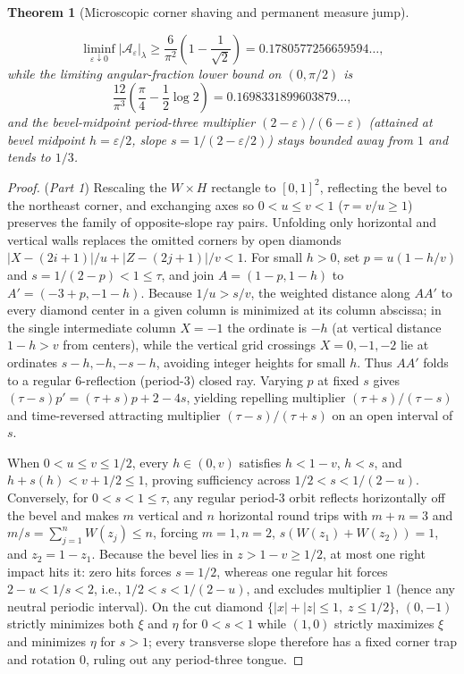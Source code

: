 \documentclass[11pt,reqno]{amsart}
\newtheorem{theorem}{Theorem}[section]
\theoremstyle{definition}
\theoremstyle{remark}
\begin{document}
\begin{theorem}[Microscopic corner shaving and permanent measure jump]
\begin{enumerate}
  \begin{equation}\label{eq:shaving-jump}
    \liminf_{\varepsilon \downarrow 0} |\mathcal{A}_\varepsilon|_\lambda \ge \frac{6}{\pi^2}\left(1 - \frac{1}{\sqrt{2}}\right) = 0.1780577256659594\ldots,
  \end{equation}
  while the limiting angular-fraction lower bound on $(0,\pi/2)$ is
  \[
    \frac{12}{\pi^3}\left(\frac{\pi}{4} - \frac{1}{2}\log 2\right) = 0.1698331899603879\ldots,
  \]
  and the bevel-midpoint period-three multiplier $(2-\varepsilon)/(6-\varepsilon)$ (attained at bevel midpoint $h = \varepsilon/2$, slope $s = 1/(2-\varepsilon/2)$) stays bounded away from $1$ and tends to $1/3$.
\end{enumerate}
\end{theorem}

\begin{proof}
(\emph{Part 1}) Rescaling the $W\times H$ rectangle to $[0,1]^2$, reflecting the bevel to the northeast corner, and exchanging axes so $0 < u \le v < 1$ ($\tau = v/u \ge 1$) preserves the family of opposite-slope ray pairs. Unfolding only horizontal and vertical walls replaces the omitted corners by open diamonds $|X-(2i+1)|/u + |Z-(2j+1)|/v < 1$. For small $h > 0$, set $p = u(1 - h/v)$ and $s = 1/(2-p) < 1 \le \tau$, and join $A = (1-p, 1-h)$ to $A' = (-3+p, -1-h)$. Because $1/u > s/v$, the weighted distance along $AA'$ to every diamond center in a given column is minimized at its column abscissa; in the single intermediate column $X = -1$ the ordinate is $-h$ (at vertical distance $1 - h > v$ from centers), while the vertical grid crossings $X = 0, -1, -2$ lie at ordinates $s-h, -h, -s-h$, avoiding integer heights for small $h$. Thus $AA'$ folds to a regular 6-reflection (period-3) closed ray. Varying $p$ at fixed $s$ gives $(\tau - s)p' = (\tau + s)p + 2 - 4s$, yielding repelling multiplier $(\tau+s)/(\tau-s)$ and time-reversed attracting multiplier $(\tau-s)/(\tau+s)$ on an open interval of $s$.

When $0 < u \le v \le 1/2$, every $h \in (0, v)$ satisfies $h < 1 - v$, $h < s$, and $h + s(h) < v + 1/2 \le 1$, proving sufficiency across $1/2 < s < 1/(2-u)$. Conversely, for $0 < s < 1 \le \tau$, any regular period-3 orbit reflects horizontally off the bevel and makes $m$ vertical and $n$ horizontal round trips with $m + n = 3$ and $m/s = \sum_{j=1}^n W(z_j) \le n$, forcing $m = 1, n = 2$, $s(W(z_1) + W(z_2)) = 1$, and $z_2 = 1 - z_1$. Because the bevel lies in $z > 1 - v \ge 1/2$, at most one right impact hits it: zero hits forces $s = 1/2$, whereas one regular hit forces $2 - u < 1/s < 2$, i.e., $1/2 < s < 1/(2-u)$, and excludes multiplier $1$ (hence any neutral periodic interval). On the cut diamond $\{|x|+|z| \le 1,\; z \le 1/2\}$, $(0,-1)$ strictly minimizes both $\xi$ and $\eta$ for $0 < s < 1$ while $(1,0)$ strictly maximizes $\xi$ and minimizes $\eta$ for $s > 1$; every transverse slope therefore has a fixed corner trap and rotation $0$, ruling out any period-three tongue.


\end{proof}
\end{document}
